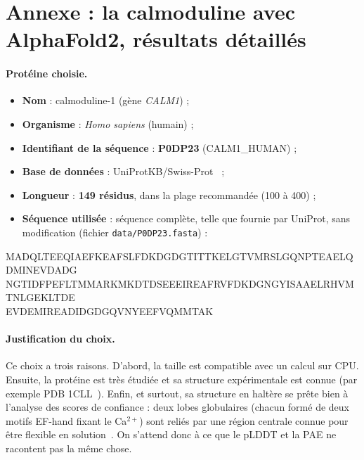 \section{Annexe : la calmoduline avec AlphaFold2, résultats détaillés}
\label{annexe:calmoduline}

\paragraph{Protéine choisie.}
\begin{itemize}
  \item \textbf{Nom} : calmoduline-1 (gène \emph{CALM1}) ;
  \item \textbf{Organisme} : \emph{Homo sapiens} (humain) ;
  \item \textbf{Identifiant de la séquence} : \textbf{P0DP23} (CALM1\_HUMAN) ;
  \item \textbf{Base de données} : UniProtKB/Swiss-Prot~\cite{uniprot_P0DP23,uniprot2023} ;
  \item \textbf{Longueur} : \textbf{149 résidus}, dans la plage recommandée (100 à 400) ;
  \item \textbf{Séquence utilisée} : séquence complète, telle que fournie par UniProt, sans modification (fichier \texttt{data/P0DP23.fasta}) :
\end{itemize}

\begin{center}
\scriptsize\ttfamily
MADQLTEEQIAEFKEAFSLFDKDGDGTITTKELGTVMRSLGQNPTEAELQDMINEVDADG\\
NGTIDFPEFLTMMARKMKDTDSEEEIREAFRVFDKDGNGYISAAELRHVMTNLGEKLTDE\\
EVDEMIREADIDGDGQVNYEEFVQMMTAK
\end{center}

\paragraph{Justification du choix.} Ce choix a trois raisons. D'abord, la taille est compatible avec un calcul sur CPU. Ensuite, la protéine est très étudiée et sa structure expérimentale est connue (par exemple PDB 1CLL~\cite{chattopadhyaya1992}). Enfin, et surtout, sa structure en \og haltère \fg{} se prête bien à l'analyse des scores de confiance : deux lobes globulaires (chacun formé de deux motifs EF-hand fixant le Ca$^{2+}$) sont reliés par une région centrale connue pour être flexible en solution~\cite{barbato1992}. On s'attend donc à ce que le pLDDT et la PAE ne racontent pas la même chose.

